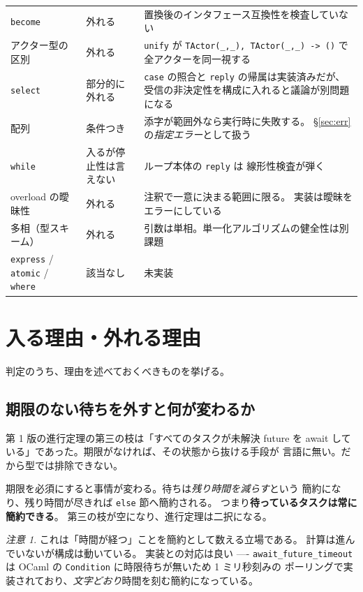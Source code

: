 \documentclass[11pt,a4paper]{ltjsarticle}
\theoremstyle{definition}
\theoremstyle{remark}
\newtheorem{remark}[theorem]{注意}
\begin{document}
\begin{center}
\begin{longtable}{@{}llp{7.0cm}@{}}
\texttt{become} & 外れる & 置換後のインタフェース互換性を検査していない \\
アクター型の区別 & 外れる & \texttt{unify} が
  \texttt{TActor(\_,\_), TActor(\_,\_) -> ()} で全アクターを同一視する \\
\texttt{select} & 部分的に外れる &
  \texttt{case} の照合と \texttt{reply} の帰属は実装済みだが、
  受信の非決定性を構成に入れると議論が別問題になる \\
配列 & 条件つき & 添字が範囲外なら実行時に失敗する。
  \S\ref{sec:err} の\emph{指定エラー}として扱う \\
\texttt{while} & 入るが停止性は言えない & ループ本体の \texttt{reply} は
  線形性検査が弾く \\
overload の曖昧性 & 外れる & 注釈で一意に決まる範囲に限る。
  実装は曖昧をエラーにしている \\
多相（型スキーム）& 外れる & 引数は単相。単一化アルゴリズムの健全性は別課題 \\
\texttt{express} / \texttt{atomic} / \texttt{where} & 該当なし & 未実装 \\
\bottomrule
\end{longtable}
\end{center}

\section{入る理由・外れる理由}

判定のうち、理由を述べておくべきものを挙げる。

\subsection{期限のない待ちを外すと何が変わるか}

第 1 版の進行定理の第三の枝は「すべてのタスクが未解決 future を
await している」であった。期限がなければ、その状態から抜ける手段が
言語に無い。だから型では排除できない。

期限を必須にすると事情が変わる。待ちは\emph{残り時間を減らす}という
簡約になり、残り時間が尽きれば \texttt{else} 節へ簡約される。
つまり\textbf{待っているタスクは常に簡約できる}。
第三の枝が空になり、進行定理は二択になる。

\begin{remark}
これは「時間が経つ」ことを簡約として数える立場である。
計算は進んでいないが構成は動いている。
実装との対応は良い ---- \texttt{await\_future\_timeout} は
OCaml の \texttt{Condition} に時限待ちが無いため 1 ミリ秒刻みの
ポーリングで実装されており、\emph{文字どおり}時間を刻む簡約になっている。
\end{remark}
\end{document}
